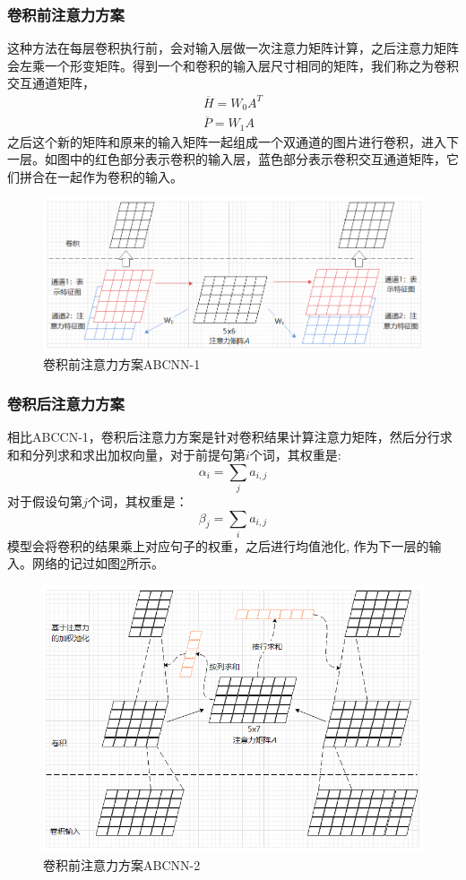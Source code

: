 \documentclass[twoside,a4paper,12pt]{book}%
\begin{document}
\subsubsection{卷积前注意力方案}
这种方法在每层卷积执行前，会对输入层做一次注意力矩阵计算，之后注意力矩阵会左乘一个形变矩阵。得到一个和卷积的输入层尺寸相同的矩阵，我们称之为卷积交互通道矩阵，
$$
\begin{aligned}
\overline{H} = W_0A^{T}\\
\overline{P} = W_1A
\end{aligned}
$$
之后这个新的矩阵和原来的输入矩阵一起组成一个双通道的图片进行卷积，进入下一层。如图中的红色部分表示卷积的输入层，蓝色部分表示卷积交互通道矩阵，它们拼合在一起作为卷积的输入。
\begin{figure}[htbp]
\begin{center}
\includegraphics[width=5.6in]{figures/abcnn1.png}
\caption{卷积前注意力方案ABCNN-1}
\label{fig:abcnn1}
\end{center}
\end{figure}
\subsubsection{卷积后注意力方案}
相比ABCCN-1，卷积后注意力方案是针对卷积结果计算注意力矩阵，然后分行求和和分列求和求出加权向量，对于前提句第$i$个词，其权重是:
$$
\alpha_i=\sum_{j}a_{i,j}
$$
对于假设句第$j$个词，其权重是：
$$
\beta_j=\sum_{i}a_{i,j}
$$
模型会将卷积的结果乘上对应句子的权重，之后进行均值池化, 作为下一层的输入。网络的记过如图\ref{fig:abcnn2}所示。
\begin{figure}[h]
\begin{center}
\includegraphics[width=6.0in]{figures/abcnn2.png}
\caption{卷积前注意力方案ABCNN-2}
\label{fig:abcnn2}
\end{center}
\end{figure}
\end{document}
